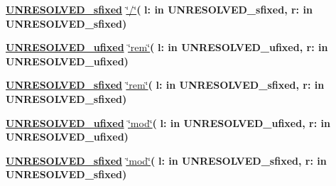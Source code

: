 \begin{DoxyCompactItemize}
\item 
{\bfseries {\bfseries {\bfseries \hyperlink{classfixed__pkg_aa723b28a027c3c0f9bca02d75e8df4d6}{U\+N\+R\+E\+S\+O\+L\+V\+E\+D\+\_\+sfixed}} \textcolor{vhdlchar}{ }}} \hyperlink{classfixed__pkg_a38133f42dc06bfa3083ee5757db5fdd1}{\char`\"{}/\char`\"{}}{\bfseries  ( }{\bfseries \textcolor{vhdlchar}{l\+: }\textcolor{stringliteral}{in }\textcolor{vhdlchar}{U\+N\+R\+E\+S\+O\+L\+V\+E\+D\+\_\+sfixed}}{\bfseries  , \textcolor{vhdlchar}{r\+: }\textcolor{stringliteral}{in }\textcolor{vhdlchar}{U\+N\+R\+E\+S\+O\+L\+V\+E\+D\+\_\+sfixed}}{\bfseries  )} 
\item 
{\bfseries {\bfseries {\bfseries \hyperlink{classfixed__pkg_ae78bc2b36d22f6abeac163955e8a587d}{U\+N\+R\+E\+S\+O\+L\+V\+E\+D\+\_\+ufixed}} \textcolor{vhdlchar}{ }}} \hyperlink{classfixed__pkg_ad1f795e1e3cf142cf7bb4dfb5b951869}{\char`\"{}rem\char`\"{}}{\bfseries  ( }{\bfseries \textcolor{vhdlchar}{l\+: }\textcolor{stringliteral}{in }\textcolor{vhdlchar}{U\+N\+R\+E\+S\+O\+L\+V\+E\+D\+\_\+ufixed}}{\bfseries  , \textcolor{vhdlchar}{r\+: }\textcolor{stringliteral}{in }\textcolor{vhdlchar}{U\+N\+R\+E\+S\+O\+L\+V\+E\+D\+\_\+ufixed}}{\bfseries  )} 
\item 
{\bfseries {\bfseries {\bfseries \hyperlink{classfixed__pkg_aa723b28a027c3c0f9bca02d75e8df4d6}{U\+N\+R\+E\+S\+O\+L\+V\+E\+D\+\_\+sfixed}} \textcolor{vhdlchar}{ }}} \hyperlink{classfixed__pkg_a456d29ab7e0ace8e29746cae8333c4a8}{\char`\"{}rem\char`\"{}}{\bfseries  ( }{\bfseries \textcolor{vhdlchar}{l\+: }\textcolor{stringliteral}{in }\textcolor{vhdlchar}{U\+N\+R\+E\+S\+O\+L\+V\+E\+D\+\_\+sfixed}}{\bfseries  , \textcolor{vhdlchar}{r\+: }\textcolor{stringliteral}{in }\textcolor{vhdlchar}{U\+N\+R\+E\+S\+O\+L\+V\+E\+D\+\_\+sfixed}}{\bfseries  )} 
\item 
{\bfseries {\bfseries {\bfseries \hyperlink{classfixed__pkg_ae78bc2b36d22f6abeac163955e8a587d}{U\+N\+R\+E\+S\+O\+L\+V\+E\+D\+\_\+ufixed}} \textcolor{vhdlchar}{ }}} \hyperlink{classfixed__pkg_a2325680210a988617a0735f076a274b6}{\char`\"{}mod\char`\"{}}{\bfseries  ( }{\bfseries \textcolor{vhdlchar}{l\+: }\textcolor{stringliteral}{in }\textcolor{vhdlchar}{U\+N\+R\+E\+S\+O\+L\+V\+E\+D\+\_\+ufixed}}{\bfseries  , \textcolor{vhdlchar}{r\+: }\textcolor{stringliteral}{in }\textcolor{vhdlchar}{U\+N\+R\+E\+S\+O\+L\+V\+E\+D\+\_\+ufixed}}{\bfseries  )} 
\item 
{\bfseries {\bfseries {\bfseries \hyperlink{classfixed__pkg_aa723b28a027c3c0f9bca02d75e8df4d6}{U\+N\+R\+E\+S\+O\+L\+V\+E\+D\+\_\+sfixed}} \textcolor{vhdlchar}{ }}} \hyperlink{classfixed__pkg_a58efbda541d57d3b818c74b97123dc5b}{\char`\"{}mod\char`\"{}}{\bfseries  ( }{\bfseries \textcolor{vhdlchar}{l\+: }\textcolor{stringliteral}{in }\textcolor{vhdlchar}{U\+N\+R\+E\+S\+O\+L\+V\+E\+D\+\_\+sfixed}}{\bfseries  , \textcolor{vhdlchar}{r\+: }\textcolor{stringliteral}{in }\textcolor{vhdlchar}{U\+N\+R\+E\+S\+O\+L\+V\+E\+D\+\_\+sfixed}}{\bfseries  )} 

\end{DoxyCompactItemize}
